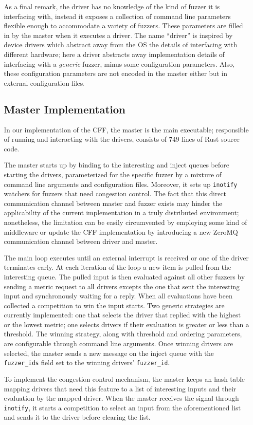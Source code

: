 As a final remark, the driver has no knowledge of the kind of fuzzer it is
interfacing with, instead it exposes a collection of command line parameters
flexible enough to accommodate a variety of fuzzers. These parameters are filled
in by the master when it executes a driver. The name ``driver'' is inspired by
device drivers which abstract away from the \ac{OS} the details of interfacing
with different hardware; here a driver abstracts away implementation details of
interfacing with a \emph{generic} fuzzer, minus some configuration parameters.
Also, these configuration parameters are not encoded in the master either but in
external configuration files.

\subsection{Master Implementation}
\label{sec:master-impl}

In our implementation of the \ac{CFF}, the master is the main executable;
responsible of running and interacting with the drivers, consists of $749$ lines
of Rust source code.

The master starts up by binding to the interesting and inject queues before
starting the drivers, parameterized for the specific fuzzer by a mixture of
command line arguments and configuration files. Moreover, it sets up
\texttt{inotify} watchers for fuzzers that need congestion control. The fact
that this direct communication channel between master and fuzzer exists may
hinder the applicability of the current implementation in a truly distributed
environment; nonetheless, the limitation can be easily circumvented by employing
some kind of middleware or update the \ac{CFF} implementation by introducing a
new ZeroMQ communication channel between driver and master.

The main loop executes until an external interrupt is received or one of the
driver terminates early. At each iteration of the loop a new item is pulled from
the interesting queue. The pulled input is then evaluated against all other
fuzzers by sending a metric request to all drivers excepts the one that sent the
interesting input and synchronously waiting for a reply. When all evaluations
have been collected a competition to win the input starts. Two generic
strategies are currently implemented: one that selects the driver that replied
with the highest or the lowest metric; one selects drivers if their evaluation
is greater or less than a threshold. The winning strategy, along with threshold
and ordering parameters, are configurable through command line arguments. Once
winning drivers are selected, the master sends a new message on the inject queue
with the \texttt{fuzzer\_ids} field set to the winning drivers'
\texttt{fuzzer\_id}.

To implement the congestion control mechanism, the master keeps an hash table
mapping drivers that need this feature to a list of interesting inputs and their
evaluation by the mapped driver. When the master receives the signal through
\texttt{inotify}, it starts a competition to select an input from the
aforementioned list and sends it to the driver before clearing the list.

